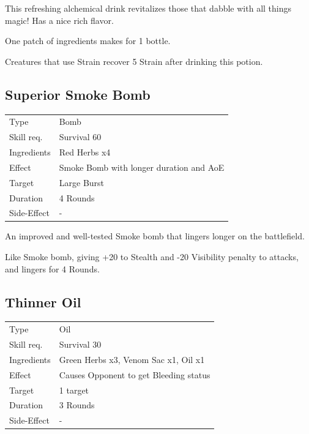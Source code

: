 \documentclass[11pt,a4paper,twocolumn]{book}
\begin{document}
\medskip

This refreshing alchemical drink revitalizes those that dabble with all things magic! Has a nice rich flavor.

One patch of ingredients makes for 1 bottle.

Creatures that use Strain recover 5 Strain after drinking this potion.


\subsection*{Superior Smoke Bomb}
{
	\begin{tabu} to 75mm{| X[l,4] | X[l,8] |}
		\hline
		Type 			& Bomb 														\\
        Skill req.	    & Survival 60 												\\
        Ingredients     & Red Herbs x4												\\
        Effect     		& Smoke Bomb with longer duration and AoE 					\\
        Target      	& Large Burst												\\
        Duration  		& 4 Rounds 												\\
        Side-Effect     & -															\\ \hline
	\end{tabu}
		
}

\medskip

An improved and well-tested Smoke bomb that lingers longer on the battlefield.

Like Smoke bomb, giving +20 to Stealth and -20 Visibility penalty to attacks, and lingers for 4 Rounds.

\vfill

\subsection*{Thinner Oil}
{
	\begin{tabu} to 75mm{| X[l,4] | X[l,8] |}
		\hline
		Type 			& Oil 														\\
        Skill req.	    & Survival 30 												\\
        Ingredients     & Green Herbs x3, Venom Sac x1, Oil x1						\\
        Effect     		& Causes Opponent to get Bleeding status 					\\
        Target      	& 1 target													\\
        Duration  		& 3 Rounds	 												\\
        Side-Effect     & -															\\ \hline
	\end{tabu}
		
}
\end{document}
